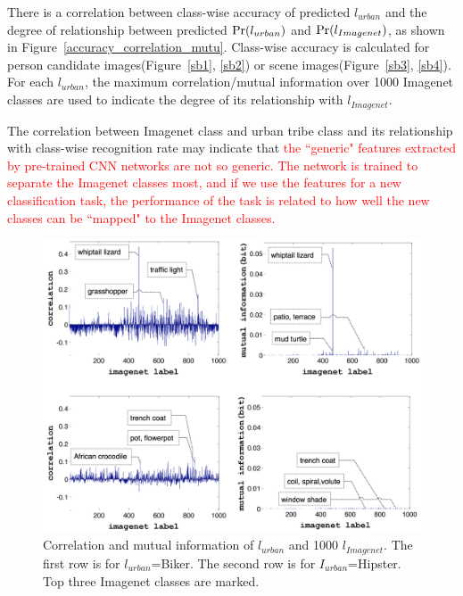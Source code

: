 \documentclass[10pt,twocolumn,letterpaper]{article}
\begin{document}
There is a correlation between class-wise accuracy of predicted $l_{urban}$ and the degree of relationship between predicted $\textup{Pr}(l_{urban})$ and $\textup{Pr}(l_{Imagenet})$, as shown in Figure~\ref{accuracy_correlation_mutu}. Class-wise accuracy is calculated for person candidate images(Figure~\ref{sb1}, \ref{sb2}) or scene images(Figure~\ref{sb3}, \ref{sb4}). For each $l_{urban}$, the maximum correlation/mutual information over 1000 Imagenet classes are used to indicate the degree of its relationship with $l_{Imagenet}$.

The correlation between Imagenet class and urban tribe class and its relationship with class-wise recognition rate may indicate that \textcolor{red} {the ``generic" features extracted by pre-trained CNN networks are not so generic. The network is trained to separate the Imagenet classes most, and if we use the features for a new classification task, the performance of the task is related to how well the new classes can be ``mapped" to the Imagenet classes. }



\begin{figure}[!t]
\begin{center}
\includegraphics[width=1\linewidth]{correlation}
\end{center}
\caption{Correlation and mutual information of $l_{urban}$ and 1000 $l_{Imagenet}$. The first row is for $l_{urban}$=Biker. The second row is for $I_{urban}$=Hipster. Top three Imagenet classes are marked. }
\label{correlation_muti}
\end{figure}
\end{document}
